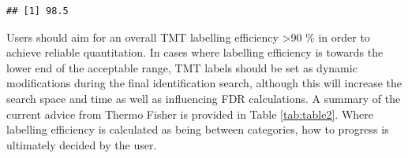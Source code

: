 \documentclass[9pt,a4paper,]{extarticle}
\newenvironment{Shaded}{\begin{snugshade}}{\end{snugshade}}
\newcommand{\AttributeTok}[1]{\textcolor[rgb]{0.13,0.29,0.53}{#1}}
\newcommand{\DecValTok}[1]{\textcolor[rgb]{0.00,0.00,0.81}{#1}}
\newcommand{\DocumentationTok}[1]{\textcolor[rgb]{0.56,0.35,0.01}{\textbf{\textit{#1}}}}
\newcommand{\FunctionTok}[1]{\textcolor[rgb]{0.13,0.29,0.53}{\textbf{#1}}}
\newcommand{\NormalTok}[1]{#1}
\newcommand{\OtherTok}[1]{\textcolor[rgb]{0.56,0.35,0.01}{#1}}
\newcommand{\SpecialCharTok}[1]{\textcolor[rgb]{0.81,0.36,0.00}{\textbf{#1}}}
\newcommand{\StringTok}[1]{\textcolor[rgb]{0.31,0.60,0.02}{#1}}
\begin{document}
\begin{Shaded}
\end{Shaded}

\begin{verbatim}
## [1] 98.5
\end{verbatim}

Users should aim for an overall TMT labelling efficiency \textgreater90 \% in order to
achieve reliable quantitation. In cases where labelling efficiency is towards
the lower end of the acceptable range, TMT labels should be set as dynamic
modifications during the final identification search, although this will
increase the search space and time as well as influencing FDR calculations. A
summary of the current advice from Thermo Fisher is provided in Table
\ref{tab:table2}. Where labelling efficiency is calculated as being between
categories, how to progress is ultimately decided by the user.
\end{document}
